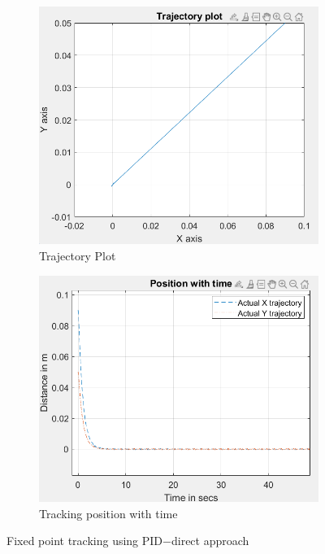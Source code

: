 \documentclass[conference]{IEEEtran}
\begin{document}
\begin{figure}[h]
     \centering
     \begin{subfigure}[b]{0.24\textwidth}
         \centering
         \includegraphics[width=\textwidth, height=\textwidth]{FPTPID2.png}
         \caption{Trajectory Plot}
         \label{FP PID2 trajectory plot}
     \end{subfigure}
     \begin{subfigure}[b]{0.24\textwidth}
         \centering
         \includegraphics[width=\textwidth,height=\textwidth]{FPTEPID2.png}
         \caption{Tracking position with time}
         \label{FP PID2 position with time}
     \end{subfigure}
        \caption{Fixed point tracking using PID$-$direct approach}
        \label{fig4 PID2}
\end{figure}
\end{document}
